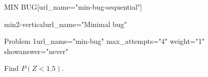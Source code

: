\documentclass[12pt]{article}
\begin{document}
\begin{edXsection}{MIN BUG}[url_name="min-bug-sequential"]
\begin{edXvertical}{min2-vertical}{url_name="Minimal bug"}
\begin{edXproblem}{Problem 1}{url_name="min-bug" max_attempts="4" weight="1" showanswer="never"}

Find $P(Z < 1.5)$.

\end{edXproblem}
\end{edXvertical}
\end{edXsection}
\end{document}
